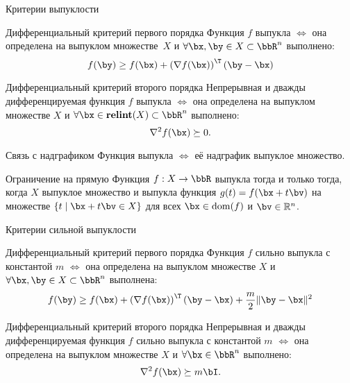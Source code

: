 \documentclass[12pt]{beamer}
\begin{document}
\begin{frame}{Критерии выпуклости}
\footnotesize
\vspace{-2mm}
\begin{block}{Дифференциальный критерий первого порядка}
Функция $f$ выпукла $\Leftrightarrow$ она определена на выпуклом множестве~$X$ и $\forall \bx, \by \in X \subset \bbR^n$ выполнено:
\vspace{-4mm}
\[
f(\by) \geq f(\bx) + \left( \nabla f(\bx) \right)^{\T} (\by - \bx)
\]
\end{block}

\begin{block}{Дифференциальный критерий второго порядка}
Непрерывная и дважды дифференцируемая функция $f$ выпукла $\Leftrightarrow$ она определена на выпуклом множестве $X$ и $\forall \bx \in \textbf{relint}(X) \subset \bbR^n$ выполнено:
\vspace{-2mm}
\[
\nabla^2 f(\bx) \succeq 0.
\]
\end{block}

\begin{block}{Связь с надграфиком}
Функция выпукла $\Leftrightarrow$ её надграфик выпуклое множество.
\end{block}

\begin{block}{Ограничение на прямую}
Функция $f: X \rightarrow \bbR$ выпукла тогда и только тогда, когда $X$ выпуклое множество и выпукла функция $g(t) = f(\bx + t\bv)$ на множестве $\{ t \mid \bx + t\bv \in X \}$ для всех $\bx \in \mathrm{dom}(f)$ и $\bv \in \mathbb{R}^n$.
\end{block}

\end{frame}

\begin{frame}{Критерии сильной выпуклости}

\begin{block}{Дифференциальный критерий первого порядка}
Функция $f$ сильно выпукла с константой $m$ $\Leftrightarrow$ она определена на выпуклом множестве $X$ и $\forall \bx, \by \in X \subset \bbR^n$ выполнена:
\vspace{-4mm}
\[
f(\by) \geq f(\bx) + \left( \nabla f(\bx) \right)^{\T} (\by - \bx) + \frac{m}{2}\| \by - \bx \|^2
\]
\end{block}

\begin{block}{Дифференциальный критерий второго порядка}
Непрерывная и дважды дифференцируемая функция $f$ сильно выпукла с константой $m$ $\Leftrightarrow$ она определена на выпуклом множестве $X$ и $\forall \bx \in  \bbR^n$ выполнено:
\vspace{-2mm}
\[
\nabla^2 f(\bx) \succeq m\bI.
\]
\end{block}
\end{frame}
\end{document}
